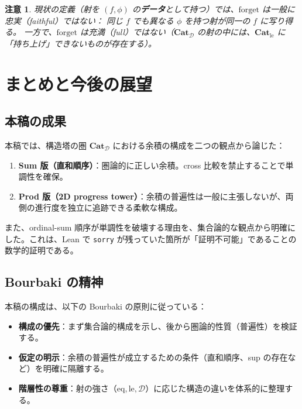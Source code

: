\documentclass[a4paper,12pt]{ltjsarticle}
\newtheorem{remark}[definition]{注意}
\theoremstyle{definition}
\begin{document}
\begin{remark}
現状の定義（射を $(f,\phi)$ の\textbf{データ}として持つ）では、$\mathrm{forget}$ は一般に忠実（faithful）ではない：
同じ $f$ でも異なる $\phi$ を持つ射が同一の $f$ に写り得る。
一方で、$\mathrm{forget}$ は充満（full）ではない（$\mathbf{Cat}_{\mathcal{D}}$ の射の中には、$\mathbf{Cat}_{\mathrm{le}}$ に「持ち上げ」できないものが存在する）。
\end{remark}

\section{まとめと今後の展望}

\subsection{本稿の成果}

本稿では、構造塔の圏 $\mathbf{Cat}_{\mathcal{D}}$ における余積の構成を二つの観点から論じた：

\begin{enumerate}
    \item \textbf{Sum 版（直和順序）}：圏論的に正しい余積。cross 比較を禁止することで単調性を確保。
    \item \textbf{Prod 版（2D progress tower）}：余積の普遍性は一般に主張しないが、両側の進行度を独立に追跡できる柔軟な構成。
\end{enumerate}

また、ordinal-sum 順序が単調性を破壊する理由を、集合論的な観点から明確にした。これは、Lean で \texttt{sorry} が残っていた箇所が「証明不可能」であることの数学的証明である。

\subsection{Bourbaki の精神}

本稿の構成は、以下の Bourbaki の原則に従っている：

\begin{itemize}
    \item \textbf{構成の優先}：まず集合論的構成を示し、後から圏論的性質（普遍性）を検証する。
    \item \textbf{仮定の明示}：余積の普遍性が成立するための条件（直和順序、sup の存在など）を明確に隔離する。
    \item \textbf{階層性の尊重}：射の強さ（$\mathrm{eq}, \mathrm{le}, \mathcal{D}$）に応じた構造の違いを体系的に整理する。
\end{itemize}
\end{document}
